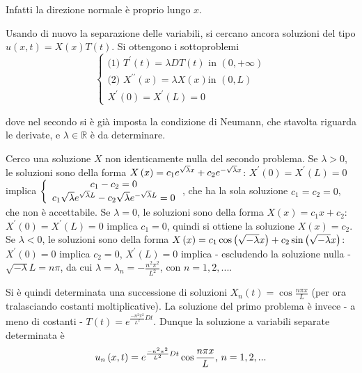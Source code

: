 \documentclass{article}
\begin{document}
Infatti la direzione normale \`{e} proprio lungo $x$. %

Usando di nuovo la separazione delle variabili, si cercano ancora soluzioni
del tipo $u\left( x,t\right) =X\left( x\right) T\left( t\right) $. Si
ottengono i sottoproblemi 
\begin{equation*}
\left\{ 
\begin{array}{c}
\text{(1) }T^{\prime }\left( t\right) =\lambda DT\left( t\right) \text{ in }%
\left( 0,+\infty \right) \\ 
\text{(2) }X^{\prime \prime }\left( x\right) =\lambda X\left( x\right) \text{
in }\left( 0,L\right) \\ 
X^{\prime }\left( 0\right) =X^{\prime }\left( L\right) =0%
\end{array}%
\right.
\end{equation*}

dove nel secondo si \`{e} gi\`{a} imposta la condizione di Neumann, che
stavolta riguarda le derivate, e $\lambda \in 
\mathbb{R}
$ \`{e} da determinare.

Cerco una soluzione $X$ non identicamente nulla del secondo problema. Se $%
\lambda >0$, le soluzioni sono della forma $X\left( x\right) =c_{1}e^{\sqrt{%
\lambda }x}+c_{2}e^{-\sqrt{\lambda }x}$: $X^{\prime }\left( 0\right)
=X^{\prime }\left( L\right) =0$ implica $\left\{ 
\begin{array}{c}
c_{1}-c_{2}=0 \\ 
c_{1}\sqrt{\lambda }e^{\sqrt{\lambda }L}-c_{2}\sqrt{\lambda }e^{-\sqrt{%
\lambda }L}=0%
\end{array}%
\right. $, che ha la sola soluzione $c_{1}=c_{2}=0$, che non \`{e}
accettabile. Se $\lambda =0$, le soluzioni sono della forma $X\left(
x\right) =c_{1}x+c_{2}$: $X^{\prime }\left( 0\right) =X^{\prime }\left(
L\right) =0$ implica $c_{1}=0$, quindi si ottiene la soluzione $X\left(
x\right) =c_{2}$. Se $\lambda <0$, le soluzioni sono della forma $X\left(
x\right) =c_{1}\cos \left( \sqrt{-\lambda }x\right) +c_{2}\sin \left( \sqrt{%
-\lambda }x\right) $: $X^{\prime }\left( 0\right) =0$ implica $c_{2}=0$, $%
X^{\prime }\left( L\right) =0$ implica - escludendo la soluzione nulla - $%
\sqrt{-\lambda }L=n\pi $, da cui $\lambda =\lambda _{n}=-\frac{n^{2}\pi ^{2}%
}{L^{2}}$, con $n=1,2,...$.

Si \`{e} quindi determinata una successione di soluzioni $X_{n}\left(
t\right) =\cos \frac{n\pi x}{L}$ (per ora tralasciando costanti
moltiplicative). La soluzione del primo problema \`{e} invece - a meno di
costanti - $T\left( t\right) =e^{\frac{-n^{2}\pi ^{2}}{L^{2}}Dt}$. Dunque la
soluzione a variabili separate determinata \`{e} 
\begin{equation*}
u_{n}\left( x,t\right) =e^{\frac{-n^{2}\pi ^{2}}{L^{2}}Dt}\cos \frac{n\pi x}{%
L}\text{, }n=1,2,...
\end{equation*}
\end{document}
